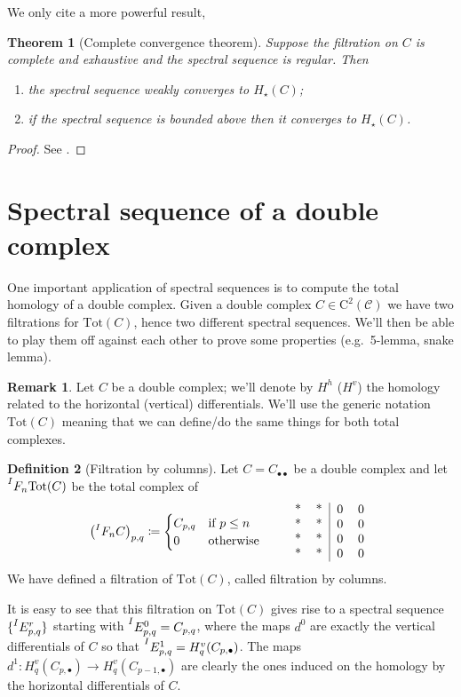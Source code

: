 \documentclass[a4paper]{article}
\newcommand{\C}{\mathcal{C}}
\newcommand{\DC}{\textrm{C}^2(\C)}
\newcommand{\Hs}{ H_{\star} }
\newcommand{\tot}{\textrm{Tot}}
\newcommand{\Ii}[1]{\prescript{I}{}{#1}}
\newcommand{\bb}{\bullet\bullet}
\theoremstyle{plain}
\newtheorem{thm}{Theorem}[section]
\theoremstyle{definition}
\newtheorem{defn}[thm]{Definition}
\newtheorem{remark}{Remark}[thm]
\begin{document}
		We only cite a more powerful result,
		\begin{thm}[Complete convergence theorem]
			\label{thm:complete-convergence}
			Suppose the filtration on $C$ is complete and exhaustive and the spectral sequence is regular. Then 
			\begin{enumerate}
				\item the spectral sequence weakly converges to $\Hs(C)$;
				\item if the spectral sequence is bounded above then it converges to $\Hs(C)$.
			\end{enumerate}
		\end{thm}
		\begin{proof}
			See \cite[140]{weibel}.
		\end{proof}
	\section{Spectral sequence of a double complex}
		One important application of spectral sequences is to compute the total homology of a double complex. Given a double complex $C \in \DC$ we have two filtrations for $\tot(C)$, hence two different spectral sequences. We'll then be able to play them off against each other to prove some properties (e.g.\ 5-lemma, snake lemma).
		\begin{remark}
			Let $C$ be a double complex; we'll denote by $H^h$ ($H^v$) the homology related to the horizontal (vertical) differentials. We'll use the generic notation $\tot(C)$ meaning that we can define/do the same things for both total complexes.
		\end{remark}
		\begin{defn}[Filtration by columns]
			Let $C = C_{\bb}$ be a double complex and let $\Ii{F_n\tot(C)}$ be the total complex of
			\begin{gather*}
				\left(\Ii{F_nC}\right)_{p,q} \coloneqq 
				\begin{cases}
					C_{p,q} & \text{if $p \leq n$}\\
					0 & \text{otherwise}
				\end{cases}\qquad
				\begin{tabular}{c c | c c}
					* & * & 0 & 0 \\
					* & * & 0 & 0 \\ 
					* & * & 0 & 0 \\
					* & * & 0 & 0 
				\end{tabular}
			\end{gather*}
			We have defined a filtration of $\tot(C)$, called filtration by columns.
		\end{defn}
		It is easy to see that this filtration on $\tot(C)$ gives rise to a spectral sequence $\{\Ii{E^r_{p,q}}\}$ starting with $\Ii{E^0_{p,q}} = C_{p,q}$, where the maps $d^0$ are exactly the vertical differentials of $C$ so that $\Ii{E^1_{p,q}} = H^v_q(C_{p, \bullet})$. The maps $d^1\colon H^v_q(C_{p, \bullet}) \to H^v_q(C_{p-1, \bullet})$ are clearly the ones induced on the homology by the horizontal differentials of $C$.
		
\end{document}
